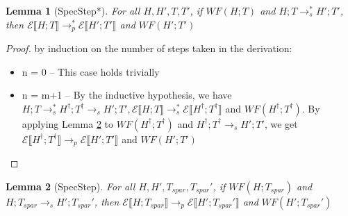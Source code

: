 \documentclass[9pt]{article}
\newtheorem{lemma}{Lemma}
\newcommand\specStep{\rightarrow_{s}}
\newcommand\parStep{\rightarrow_{p}}
\newcommand{\erase}[1]{\mathcal{E}\llbracket #1 \rrbracket}
\begin{document}
\begin{lemma}[SpecStep*]
\label{specStepStar}
For all $H, H', T, T'$, if $WF(H; T)$ and $H; T \specStep^* H'; T'$, then $\erase{H; T} \parStep^* \erase{H'; T'}$ and $WF(H'; T')$
\end{lemma}

\begin{proof}
by induction on the number of steps taken in the derivation:
\begin{itemize}
\item n = 0 -- This case holds trivially
\item n = m+1 -- By the inductive hypothesis, we have $H; T \specStep^* H^\dagger; T^\dagger \specStep H'; T', \erase{H; T} \specStep^* \erase{H^\dagger; T^\dagger}$ and $WF(H^\dagger; T^\dagger)$.  By applying Lemma \ref{specStep} to $WF(H^\dagger; T^\dagger)$ and $H^\dagger; T^\dagger \specStep H'; T'$, we get
$\erase{H^\dagger; T^\dagger} \parStep \erase{H'; T'}$ and $WF(H'; T')$
\end{itemize}
\end{proof}

\begin{lemma}[SpecStep]
\label{specStep}
For all $H, H', T_{spar}, T_{spar}'$, if $WF(H; T_{spar})$ and $H; T_{spar} \specStep H'; T_{spar}'$, then $\erase{H; T_{spar}} \parStep \erase{H'; T_{spar}'}$ and $WF(H'; T_{spar}')$

\end{lemma}
\end{document}
